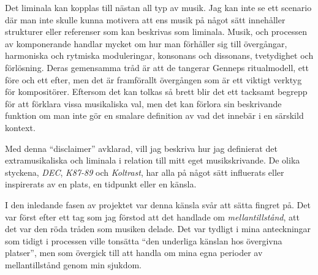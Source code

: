 \documentclass{article}
\begin{document}

Det liminala kan kopplas till nästan all typ av musik. Jag kan inte se ett scenario där man inte skulle kunna
motivera att ens musik på något sätt innehåller strukturer eller referenser som kan beskrivas som liminala.
Musik, och processen av komponerande handlar mycket om hur man förhåller sig till övergångar, harmoniska och
rytmiska moduleringar, konsonans och dissonans, tvetydighet och förlösning. Deras gemensamma tråd är att de
tangerar Genneps ritualmodell, ett före och ett efter, men det är framförallt övergången som är ett viktigt
verktyg för kompositörer. Eftersom det kan tolkas så brett blir det ett tacksamt begrepp för att förklara
vissa musikaliska val, men det kan förlora sin beskrivande funktion om man inte gör en smalare definition av
vad det innebär i en särskild kontext.

Med denna ``disclaimer'' avklarad, vill jag beskriva hur jag definierat det extramusikaliska och liminala i
relation till mitt eget musikskrivande. De olika styckena, \emph{DEC}, \emph{K87-89} och \emph{Koltrast}, har
alla på något sätt influerats eller inspirerats av en plats, en tidpunkt eller en känsla. 

I den inledande fasen av projektet var denna känsla svår att sätta fingret på. Det var först efter ett tag som
jag förstod att det handlade om \emph{mellantillstånd}, att det var den röda tråden som musiken delade. Det
var tydligt i mina anteckningar som tidigt i processen ville tonsätta ``den underliga känslan hos övergivna
platser'', men som övergick till att handla om mina egna perioder av mellantillstånd genom min sjukdom.
\end{document}
